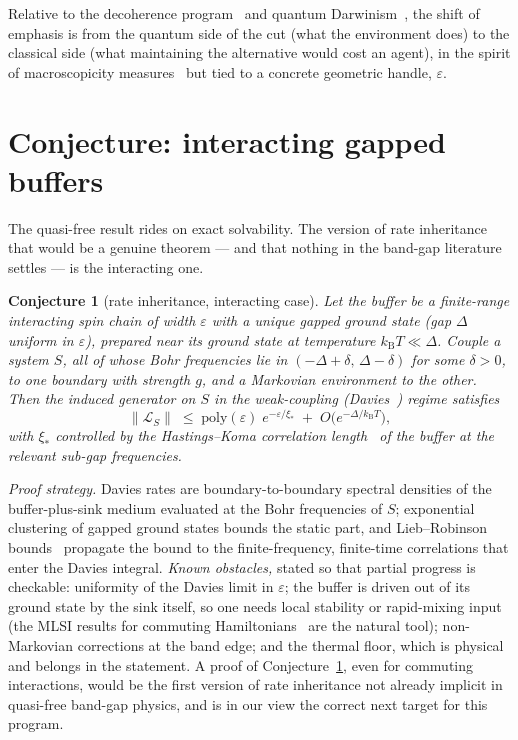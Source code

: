 \documentclass[11pt,a4paper]{article}
\newtheorem{conjecture}{Conjecture}
\theoremstyle{remark}
\newcommand{\eps}{\varepsilon}
\newcommand{\kB}{k_{\mathrm{B}}}
\begin{document}
Relative to the decoherence program~\cite{JoosZeh1985,Zurek2003RMP,Schlosshauer2004} and
quantum Darwinism~\cite{Zurek2009}, the shift of emphasis is from the quantum side of the
cut (what the environment does) to the classical side (what maintaining the alternative
would cost an agent), in the spirit of macroscopicity
measures~\cite{NimmrichterHornberger2013} but tied to a concrete geometric handle,
$\eps$.

\section{Conjecture: interacting gapped buffers}
\label{sec:conjecture}

The quasi-free result rides on exact solvability. The version of rate inheritance that
would be a genuine theorem --- and that nothing in the band-gap literature settles --- is
the interacting one.

\begin{conjecture}[rate inheritance, interacting case]
\label{conj:interacting}
Let the buffer be a finite-range interacting spin chain of width $\eps$ with a unique
gapped ground state (gap $\Delta$ uniform in $\eps$), prepared near its ground state at
temperature $\kB T \ll \Delta$. Couple a system $S$, all of whose Bohr frequencies lie in
$(-\Delta + \delta,\, \Delta - \delta)$ for some $\delta > 0$, to one boundary with
strength $g$, and a Markovian environment to the other. Then the induced generator on $S$
in the weak-coupling (Davies~\cite{Davies1974}) regime satisfies
\begin{equation}
  \|\mathcal L_S\| \;\leq\; \mathrm{poly}(\eps)\; e^{-\eps/\xi_\ast}
  \;+\; O\!\big(e^{-\Delta/\kB T}\big),
\end{equation}
with $\xi_\ast$ controlled by the Hastings--Koma correlation
length~\cite{HastingsKoma2006} of the buffer at the relevant sub-gap frequencies.
\end{conjecture}

\emph{Proof strategy.} Davies rates are boundary-to-boundary spectral densities of the
buffer-plus-sink medium evaluated at the Bohr frequencies of $S$; exponential clustering
of gapped ground states bounds the static part, and Lieb--Robinson
bounds~\cite{LiebRobinson1972,Poulin2010} propagate the bound to the finite-frequency,
finite-time correlations that enter the Davies integral. \emph{Known obstacles,} stated
so that partial progress is checkable: uniformity of the Davies limit in $\eps$; the
buffer is driven out of its ground state by the sink itself, so one needs local stability
or rapid-mixing input (the MLSI results for commuting
Hamiltonians~\cite{CapelRouze2020} are the natural tool); non-Markovian corrections at
the band edge; and the thermal floor, which is physical and belongs in the statement. A
proof of Conjecture~\ref{conj:interacting}, even for commuting interactions, would be the
first version of rate inheritance not already implicit in quasi-free band-gap physics,
and is in our view the correct next target for this program.
\end{document}
